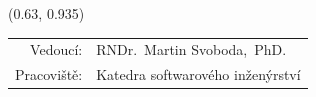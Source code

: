\documentclass[a0paper]{uioposter}
\begin{document}
\begin{frame}
  \begin{textblock}{0.5}(0.63, 0.935)
    \color{white}
    \sffamily
    \begin{tabular}{rl}
      Vedoucí:    & RNDr.~Martin Svoboda,~PhD.
      \\
      Pracoviště: & Katedra softwarového inženýrství
    \end{tabular}
  \end{textblock}


\end{frame}
\end{document}
